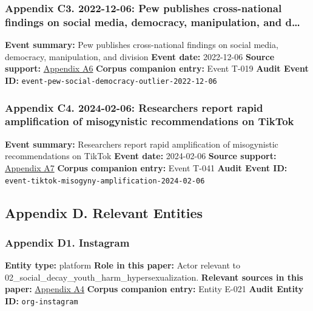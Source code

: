 \documentclass[
  american,
  11pt,
  letterpaper,
]{article}
\begin{document}
\subsubsection{Appendix C3. 2022-12-06: Pew publishes cross-national
findings on social media, democracy, manipulation, and
d\ldots{}}\label{ch-02-appendix-c3-2022-12-06-pew-publishes-cross-national-findings-on-social-media-democracy-manipulation-and-division}

\textbf{Event summary:} Pew publishes cross-national findings on social
media, democracy, manipulation, and division \textbf{Event date:}
2022-12-06 \textbf{Source support:}
\hyperref[ch-02-appendix-a6-social-media-seen-as-mostly-good-for-democracy-across-many-nations-but-u-s-is-a-major-outlier]{Appendix
A6} \textbf{Corpus companion entry:} Event T-019 \textbf{Audit Event
ID:} \texttt{event-pew-social-democracy-outlier-2022-12-06}

\subsubsection{Appendix C4. 2024-02-06: Researchers report rapid
amplification of misogynistic recommendations on
TikTok}\label{ch-02-appendix-c4-2024-02-06-researchers-report-rapid-amplification-of-misogynistic-recommendations-on-tiktok}

\textbf{Event summary:} Researchers report rapid amplification of
misogynistic recommendations on TikTok \textbf{Event date:} 2024-02-06
\textbf{Source support:}
\hyperref[ch-02-appendix-a7-social-media-algorithms-amplifying-misogynistic-content]{Appendix
A7} \textbf{Corpus companion entry:} Event T-041 \textbf{Audit Event
ID:} \texttt{event-tiktok-misogyny-amplification-2024-02-06}

\subsection{Appendix D. Relevant
Entities}\label{appendix-d.-relevant-entities-2}

\subsubsection{Appendix D1.
Instagram}\label{ch-02-appendix-d1-instagram}

\textbf{Entity type:} platform \textbf{Role in this paper:} Actor
relevant to 02\_social\_decay\_youth\_harm\_hypersexualization.
\textbf{Relevant sources in this paper:}
\hyperref[ch-02-appendix-a4-unfiltered-how-teens-engage-in-body-image-and-shaming-discussions-via-instagram-direct-messages-dms]{Appendix
A4} \textbf{Corpus companion entry:} Entity E-021 \textbf{Audit Entity
ID:} \texttt{org-instagram}
\end{document}
